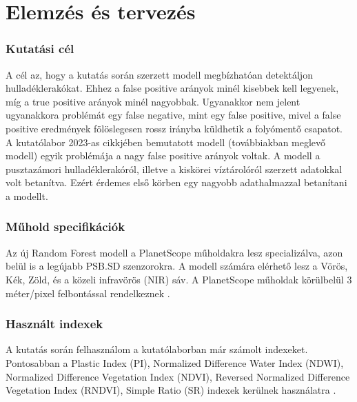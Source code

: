 \chapter{Elemzés és tervezés}
\label{ch:spec}

\subsection{Kutatási cél}

A cél az, hogy a kutatás során szerzett modell megbízhatóan detektáljon hulladéklerakókat. Ehhez a false positive arányok minél kisebbek kell legyenek, míg a true positive arányok minél nagyobbak. Ugyanakkor nem jelent ugyanakkora problémát egy false negative, mint egy false positive, mivel a false positive eredmények fölöslegesen rossz irányba küldhetik a folyómentő csapatot. 
A kutatólabor 2023-as cikkjében bemutatott modell (továbbiakban meglevő modell) egyik problémája a nagy false positive arányok voltak. A modell a pusztazámori hulladéklerakóról, illetve a kiskörei víztárolóról szerzett adatokkal volt betanítva. Ezért érdemes első körben egy nagyobb adathalmazzal betanítani a modellt.

\subsection{Műhold specifikációk}

Az új Random Forest modell a PlanetScope műholdakra lesz specializálva, azon belül is a legújabb PSB.SD szenzorokra\cite{planetsensors2024}. A modell számára elérhető lesz a Vörös, Kék, Zöld, és a közeli infravörös (NIR) sáv. A PlanetScope műholdak körülbelül 3 méter/pixel felbontással rendelkeznek \cite{planetresolution2024}.

\subsection{Használt indexek}

A kutatás során felhasználom a kutatólaborban már számolt indexeket. Pontosabban a Plastic Index (PI), Normalized Difference Water Index (NDWI), Normalized Difference Vegetation Index (NDVI), Reversed Normalized Difference Vegetation Index (RNDVI), Simple Ratio (SR) indexek kerülnek használatra .